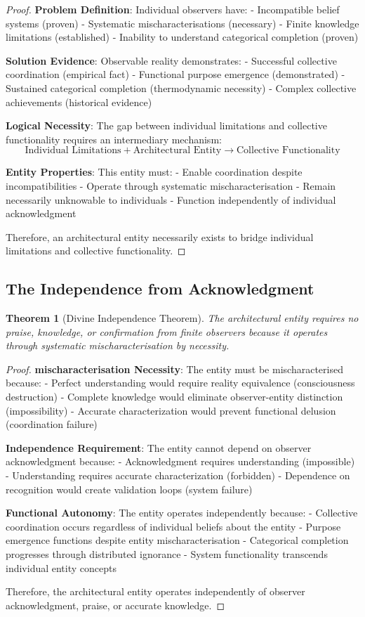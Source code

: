 \documentclass[12pt,a4paper]{article}
\newtheorem{theorem}{Theorem}[section]
\begin{document}
\begin{proof}
\textbf{Problem Definition}: Individual observers have:
- Incompatible belief systems (proven)
- Systematic mischaracterisations (necessary)
- Finite knowledge limitations (established)
- Inability to understand categorical completion (proven)

\textbf{Solution Evidence}: Observable reality demonstrates:
- Successful collective coordination (empirical fact)
- Functional purpose emergence (demonstrated)
- Sustained categorical completion (thermodynamic necessity)
- Complex collective achievements (historical evidence)

\textbf{Logical Necessity}: The gap between individual limitations and collective functionality requires an intermediary mechanism:
$$\text{Individual Limitations} + \text{Architectural Entity} \to \text{Collective Functionality}$$

\textbf{Entity Properties}: This entity must:
- Enable coordination despite incompatibilities
- Operate through systematic mischaracterisation
- Remain necessarily unknowable to individuals
- Function independently of individual acknowledgment

Therefore, an architectural entity necessarily exists to bridge individual limitations and collective functionality.
\end{proof}

\subsection{The Independence from Acknowledgment}

\begin{theorem}[Divine Independence Theorem]
The architectural entity requires no praise, knowledge, or confirmation from finite observers because it operates through systematic mischaracterisation by necessity.
\end{theorem}

\begin{proof}
\textbf{mischaracterisation Necessity}: The entity must be mischaracterised because:
- Perfect understanding would require reality equivalence (consciousness destruction)
- Complete knowledge would eliminate observer-entity distinction (impossibility)
- Accurate characterization would prevent functional delusion (coordination failure)

\textbf{Independence Requirement}: The entity cannot depend on observer acknowledgment because:
- Acknowledgment requires understanding (impossible)
- Understanding requires accurate characterization (forbidden)
- Dependence on recognition would create validation loops (system failure)

\textbf{Functional Autonomy}: The entity operates independently because:
- Collective coordination occurs regardless of individual beliefs about the entity
- Purpose emergence functions despite entity mischaracterisation
- Categorical completion progresses through distributed ignorance
- System functionality transcends individual entity concepts

Therefore, the architectural entity operates independently of observer acknowledgment, praise, or accurate knowledge.
\end{proof}
\end{document}
